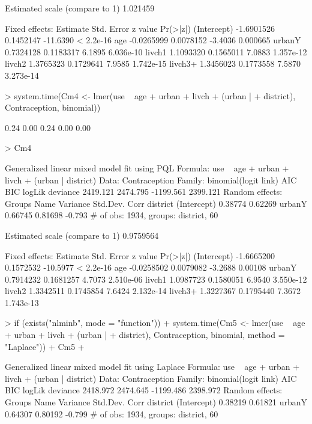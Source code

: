\documentclass[12pt]{article}
\begin{document}
\begin{Schunk}
\begin{Soutput}
Estimated scale (compare to 1)  1.021459 

Fixed effects:
              Estimate Std. Error  z value  Pr(>|z|)
(Intercept) -1.6901526  0.1452147 -11.6390 < 2.2e-16
age         -0.0265999  0.0078152  -3.4036  0.000665
urbanY       0.7324128  0.1183317   6.1895 6.036e-10
livch1       1.1093320  0.1565011   7.0883 1.357e-12
livch2       1.3765323  0.1729641   7.9585 1.742e-15
livch3+      1.3456023  0.1773558   7.5870 3.273e-14
\end{Soutput}
\begin{Sinput}
> system.time(Cm4 <- lmer(use ~ age + urban + livch + (urban | 
+     district), Contraception, binomial))
\end{Sinput}
\begin{Soutput}
[1] 0.24 0.00 0.24 0.00 0.00
\end{Soutput}
\begin{Sinput}
> Cm4
\end{Sinput}
\begin{Soutput}
Generalized linear mixed model fit using PQL 
Formula: use ~ age + urban + livch + (urban | district) 
   Data: Contraception 
 Family: binomial(logit link)
      AIC      BIC    logLik deviance
 2419.121 2474.795 -1199.561 2399.121
Random effects:
 Groups   Name        Variance Std.Dev. Corr   
 district (Intercept) 0.38774  0.62269         
          urbanY      0.66745  0.81698  -0.793 
# of obs: 1934, groups: district, 60

Estimated scale (compare to 1)  0.9759564 

Fixed effects:
              Estimate Std. Error  z value  Pr(>|z|)
(Intercept) -1.6665200  0.1572532 -10.5977 < 2.2e-16
age         -0.0258502  0.0079082  -3.2688   0.00108
urbanY       0.7914232  0.1681257   4.7073 2.510e-06
livch1       1.0987723  0.1580051   6.9540 3.550e-12
livch2       1.3342511  0.1745854   7.6424 2.132e-14
livch3+      1.3227367  0.1795440   7.3672 1.743e-13
\end{Soutput}
\begin{Sinput}
> if (exists("nlminb", mode = "function")) {
+     system.time(Cm5 <- lmer(use ~ age + urban + livch + (urban | 
+         district), Contraception, binomial, method = "Laplace"))
+     Cm5
+ }
\end{Sinput}
\begin{Soutput}
Generalized linear mixed model fit using Laplace 
Formula: use ~ age + urban + livch + (urban | district) 
   Data: Contraception 
 Family: binomial(logit link)
      AIC      BIC    logLik deviance
 2418.972 2474.645 -1199.486 2398.972
Random effects:
 Groups   Name        Variance Std.Dev. Corr   
 district (Intercept) 0.38219  0.61821         
          urbanY      0.64307  0.80192  -0.799 
# of obs: 1934, groups: district, 60


\end{Soutput}
\end{Schunk}
\end{document}
